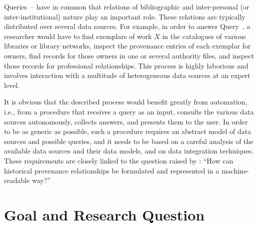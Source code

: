 Queries~--
have in common that relations of bibliographic and inter-personal (or inter-institutional)
nature play an important role.
These relations are typically distributed over several data sources.
For example, in order to answer Query~,
a researcher would have to find exemplars of work $X$
in the catalogues of various libraries or library networks,
inspect the provenance entries of each exemplar for owners,
find records for those owners in one or several authority files,
and inspect those records for professional relationships.
This process is highly laborious
and involves interaction with a multitude of heterogeneous data sources
at an expert level.

It is obvious that the described process would benefit greatly 
from automation, i.e., from a procedure that receives a query as an input,
consults the various data sources autonomously, collects answers, and presents them
to the user. In order to be as generic as possible,
such a procedure requires an abstract model of data sources and possible queries,
and it needs to be based on a careful analysis of the available data sources and their data models,
and on data integration techniques. These requirements are closely linked
to the question raised by \textcite[p.\,46, translated from German]{Hakelberg2016}:
\enquote{How can historical provenance relationships be formulated and represented
in a machine-readable way?}

%


%
\section{Goal and Research Question}
\label{sec:research_questions}

